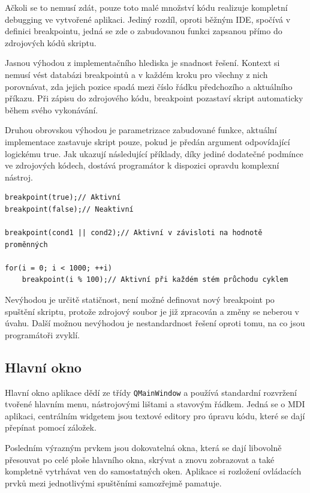 \documentclass[11pt,twoside,a4paper]{book}
\begin{document}
Ačkoli se to nemusí zdát, pouze toto malé množství kódu realizuje kompletní debugging ve vytvořené aplikaci. Jediný rozdíl, oproti běžným IDE, spočívá v definici breakpointu, jedná se zde o zabudovanou funkci zapsanou přímo do zdrojových kódů skriptu.

Jasnou výhodou z implementačního hlediska je snadnost řešení. Kontext si nemusí vést databázi breakpointů a v každém kroku pro všechny z nich porovnávat, zda jejich pozice spadá mezi číslo řádku předchozího a aktuálního příkazu. Při zápisu do zdrojového kódu, breakpoint pozastaví skript automaticky během svého vykonávání.

Druhou obrovskou výhodou je parametrizace zabudované funkce, aktuální implementace zastavuje skript pouze, pokud je předán argument odpovídající logickému true. Jak ukazují následující příklady, díky jediné dodatečné podmínce ve zdrojových kódech, dostává programátor k dispozici opravdu komplexní nástroj.

\begin{verbatim}
breakpoint(true);// Aktivní
breakpoint(false);// Neaktivní

breakpoint(cond1 || cond2);// Aktivní v závisloti na hodnotě proměnných

for(i = 0; i < 1000; ++i)
    breakpoint(i % 100);// Aktivní při každém stém průchodu cyklem
\end{verbatim}

Nevýhodou je určitě statičnost, není možné definovat nový breakpoint po spuštění skriptu, protože zdrojový soubor je již zpracován a změny se neberou v úvahu. Další možnou ne\-vý\-ho\-dou je nestandardnost řešení oproti tomu, na co jsou programátoři zvyklí.


\subsection{Hlavní okno}

Hlavní okno aplikace dědí ze třídy \texttt{QMainWindow} a používá standardní rozvržení tvořené hlavním menu, nástrojovými lištami a stavovým řádkem. Jedná se o MDI aplikaci, centrálním widgetem jsou textové editory pro úpravu kódu, které se dají přepínat pomocí záložek.

Posledním výrazným prvkem jsou dokovatelná okna, která se dají libovolně přesouvat po celé ploše hlavního okna, skrývat a znovu zobrazovat a také kompletně vytrhávat ven do samostatných oken. Aplikace si rozložení ovládacích prvků mezi jednotlivými spuštěními samozřejmě pamatuje.
\end{document}
